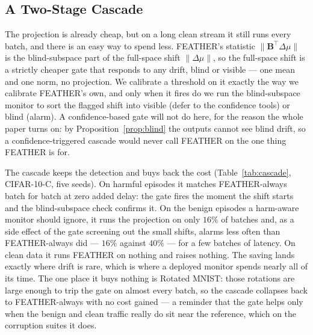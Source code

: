 \documentclass[acmsmall,screen]{acmart}
\theoremstyle{acmdefinition}
\begin{document}
\subsection{A Two-Stage Cascade}
\label{sec:cascade}

The projection is already cheap, but on a long clean stream it still runs every
batch, and there is an easy way to spend less. FEATHER's statistic
$\|\mathbf{B}^\top\Delta\mu\|$ is the blind-subspace part of the full-space
shift $\|\Delta\mu\|$, so the full-space shift is a strictly cheaper gate that
responds to any drift, blind or visible --- one mean and one norm, no
projection. We calibrate a threshold on it exactly the way we calibrate
FEATHER's own, and only when it fires do we run the blind-subspace monitor to
sort the flagged shift into visible (defer to the confidence tools) or blind
(alarm). A confidence-based gate will not do here, for the reason the whole
paper turns on: by Proposition~\ref{prop:blind} the outputs cannot see blind
drift, so a confidence-triggered cascade would never call FEATHER on the one
thing FEATHER is for.

The cascade keeps the detection and buys back the cost
(Table~\ref{tab:cascade}, CIFAR-10-C, five seeds). On harmful episodes it
matches FEATHER-always batch for batch at zero added delay: the gate fires the
moment the shift starts and the blind-subspace check confirms it. On the benign
episodes a harm-aware monitor should ignore, it runs the projection on only
$16\%$ of batches and, as a side effect of the gate screening out the small
shifts, alarms less often than FEATHER-always did --- $16\%$ against $40\%$ ---
for a few batches of latency. On clean data it runs FEATHER on nothing and
raises nothing. The saving lands exactly where drift is rare, which is where a
deployed monitor spends nearly all of its time. The one place it buys nothing
is Rotated MNIST: those rotations are large enough to trip the gate on almost
every batch, so the cascade collapses back to FEATHER-always with no cost
gained --- a reminder that the gate helps only when the benign
and clean traffic really do sit near the reference, which on the corruption
suites it does.
\end{document}
